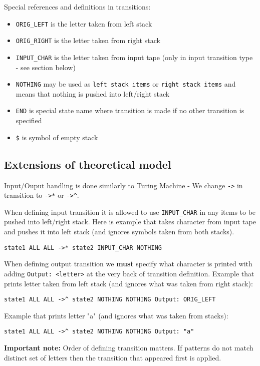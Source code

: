 \documentclass[english,shortabstract,mgr]{iithesis}
\begin{document}
Special references and definitions in transitions:
\begin{itemize}
  \item \texttt{ORIG\_LEFT} is the letter taken from left stack
  \item \texttt{ORIG\_RIGHT} is the letter taken from right stack
  \item \texttt{INPUT\_CHAR} is the letter taken from input tape
      (only in input transition type - see section below)
  \item \texttt{NOTHING} may be used as \texttt{left stack items} or \texttt{right stack items}
      and means that nothing is pushed into left/right stack
  \item \texttt{END} is special state name where transition is made if no other transition is specified
  \item \texttt{\$} is symbol of empty stack
\end{itemize}

\subsection {Extensions of theoretical model}

Input/Ouput handling is done similarly to Turing Machine - We change \texttt{->} in transition
to \texttt{->*} or \texttt{->\^}.

When defining input transition it is allowed to use \texttt{INPUT\_CHAR} in any items
to be pushed into left/right stack. Here is example that takes character from input
tape and pushes it into left stack (and ignores symbols taken from both stacks).
\begin{verbatim}
state1 ALL ALL ->* state2 INPUT_CHAR NOTHING
\end{verbatim}

When defining output transition we \textbf{must} specify what character is printed
with adding \texttt{Output: <letter>} at the very back of transition definition.
Example that prints letter taken from left stack (and ignores what was taken from right stack):
\begin{verbatim}
state1 ALL ALL ->^ state2 NOTHING NOTHING Output: ORIG_LEFT
\end{verbatim}
Example that prints letter "a" (and ignores what was taken from stacks):
\begin{verbatim}
state1 ALL ALL ->^ state2 NOTHING NOTHING Output: "a"
\end{verbatim}

\textbf{Important note:} Order of defining transition matters. If patterns do not match
distinct set of letters then the transition that appeared first is applied.
\end{document}
